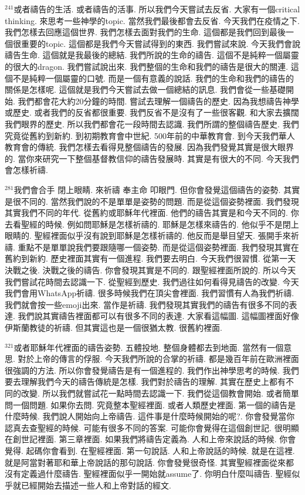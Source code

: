 \documentclass{book}
\begin{document}
$^{241}$或者禱告的生活.
或者禱告的活事.
所以我們今天嘗試去反省.
大家有一個critical thinking.
來思考一些神學的topic.
當然我們最後都會去反省.
今天我們在疫情之下.
我們怎樣去回應這個世界.
我們怎樣去面對我們的生命.
這個都是我們回到最後一個很重要的topic.
這個都是我們今天嘗試得到的東西.
我們嘗試來說.
今天我們會說禱告生命.
這個就是我最後的總結.
我們所說的生命的禱告.
這個不是純粹一個屬靈的很大的dragon.
我們嘗試說出來.
我們整個的生命和我們的禱告是很大的關連.
這個不是純粹一個屬靈的口號.
而是一個有意義的說話.
我們的生命和我們的禱告的關係是怎樣呢.
這個就是我們今天嘗試去做一個總結的訊息.
我們會從一些基礎開始.
我們都會花大約20分鐘的時間.
嘗試去理解一個禱告的歷史.
因為我想禱告神學或歷史.
或者我們的反省都很重要.
我們反省不是沒有了一些很客觀.
和大家去擴闊我們眼界的歷史.
所以我們都會花一段時間去認識.
我們所謂的整個禱告歷史.
我們究竟從舊約到新約.
到初期教育會中世紀.
500年前的中華教育會.
到今天我們華人教育會的傳統.
我們怎樣去看得見整個禱告的發展.
因為我們發覺其實是很大眼界的.
當你來研究一下整個基督教信仰的禱告發展時.
其實是有很大的不同.
今天我們會怎樣祈禱.

$^{281}$我們會合手 閉上眼睛.
來祈禱 奉主命 叩眼門.
但你會發覺這個禱告的姿勢.
其實是很不同的.
當然我們說的不是單單是姿勢的問題.
而是從這個姿勢裡面.
我們發現其實我們不同的年代.
從舊約或耶穌年代裡面.
他們的禱告其實是和今天不同的.
你去看聖經的時候.
例如問耶穌是怎樣祈禱的.
耶穌是怎樣來禱告的.
他似乎不是閉上眼睛的.
聖經裡面似乎沒有說到耶穌是怎樣祈禱的.
他反而是舉目望天.
張開手來祈禱.
重點不是單單說我們要跟隨哪一個姿勢.
而是從這個姿勢裡面.
我們發現其實在舊約到新約.
歷史裡面其實有一個進程.
我們要去明白.
今天我們很習慣.
從第一天決戰之後.
決戰之後的禱告.
你會發現其實是不同的.
跟聖經裡面所說的.
所以今天我們嘗試花時間去認識一下.
從聖經到歷史.
我們過往如何看得見禱告的改變.
今天我們會用WhatsApp祈禱.
很多時候我們在頂尖會裡面.
我們習慣有人為我們祈禱.
我們就會按一些emoji出來.
當作是祈禱.
我們發現其實我們的禱告有很多不同的表達.
我們說其實禱告裡面都可以有很多不同的表達.
大家看這幅圖.
這幅圖裡面好像伊斯蘭教徒的祈禱.
但其實這也是一個很猶太教.
很舊約裡面.

$^{321}$或者耶穌年代裡面的禱告姿勢.
五體投地.
整個身體都去到地面.
當然有一個意思.
對於上帝的傳言的俘服.
今天我們所說的合掌的祈禱.
都是幾百年前在歐洲裡面很強調的方法.
所以你會發覺禱告是有一個進程的.
我們作出神學思考的時候.
我們要去理解我們今天的禱告傳統是怎樣.
我們對於禱告的理解.
其實在歷史上都有不同的改變.
所以我們就嘗試花一點時間去認識一下.
我們從這個教會開始.
或者簡單問一個問題.
如果你去問.
究竟整本聖經裡面.
或者人類歷史裡面.
第一個的禱告是什麼時候.
我們說人開始向上帝禱告.
這件事是什麼時候開始的呢?.
你會發覺當你認真去查聖經的時候.
可能有很多不同的答案.
可能你會覺得在這個創世記.
很明顯在創世記裡面.
第三章裡面.
如果我們將禱告定義為.
人和上帝來說話的時候.
你會覺得.
起碼你會看到.
在聖經裡面.
第一句說話.
人和上帝說話的時候.
就是在這裡.
就是阿當對著耶和華上帝說話的那句說話.
你會發覺很奇怪.
其實聖經裡面從來都沒有定義過什麼禱告.
聖經裡面似乎一開始就assume了.
你明白什麼叫禱告.
聖經似乎就已經開始去描述一些人和上帝對話的經文.
\end{document}

